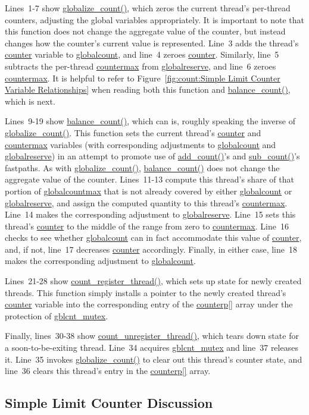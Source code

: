 Lines~1-7 show \url{globalize_count()}, which zeros the current thread's
per-thread counters, adjusting the global variables appropriately.
It is important to note that this function does not change the aggregate
value of the counter, but instead changes how the counter's current value
is represented.
Line~3 adds the thread's \url{counter} variable to \url{globalcount},
and line~4 zeroes \url{counter}.
Similarly, line~5 subtracts the per-thread \url{countermax} from
\url{globalreserve}, and line~6 zeroes \url{countermax}.
It is helpful to refer to
Figure~\ref{fig:count:Simple Limit Counter Variable Relationships}
when reading both this function and \url{balance_count()}, which is next.

Lines~9-19 show \url{balance_count()}, which can is, roughly speaking
the inverse of \url{globalize_count()}.
This function sets the current thread's \url{counter} and \url{countermax}
variables (with corresponding adjustments to \url{globalcount}
and \url{globalreserve}) in an attempt to promote use of
\url{add_count()}'s and \url{sub_count()}'s fastpaths.
As with \url{globalize_count()}, \url{balance_count()} does not change
the aggregate value of the counter.
Lines~11-13 compute this thread's share of that portion of
\url{globalcountmax} that is not already covered by either
\url{globalcount} or \url{globalreserve}, and assign the
computed quantity to this thread's \url{countermax}.
Line~14 makes the corresponding adjustment to \url{globalreserve}.
Line~15 sets this thread's \url{counter} to the middle of the range
from zero to \url{countermax}.
Line~16 checks to see whether \url{globalcount} can in fact accommodate
this value of \url{counter}, and, if not, line~17 decreases \url{counter}
accordingly.
Finally, in either case, line~18 makes the corresponding adjustment to
\url{globalcount}.

Lines~21-28 show \url{count_register_thread()}, which sets up state for
newly created threads.
This function simply installs
a pointer to the newly created thread's \url{counter} variable into
the corresponding entry of the \url{counterp[]} array under the protection
of \url{gblcnt_mutex}.

Finally, lines~30-38 show \url{count_unregister_thread()}, which tears down
state for a soon-to-be-exiting thread.
Line~34 acquires \url{gblcnt_mutex} and line~37 releases it.
Line~35 invokes \url{globalize_count()} to clear out this thread's
counter state, and line~36 clears this thread's entry in the
\url{counterp[]} array.

\subsection{Simple Limit Counter Discussion}

